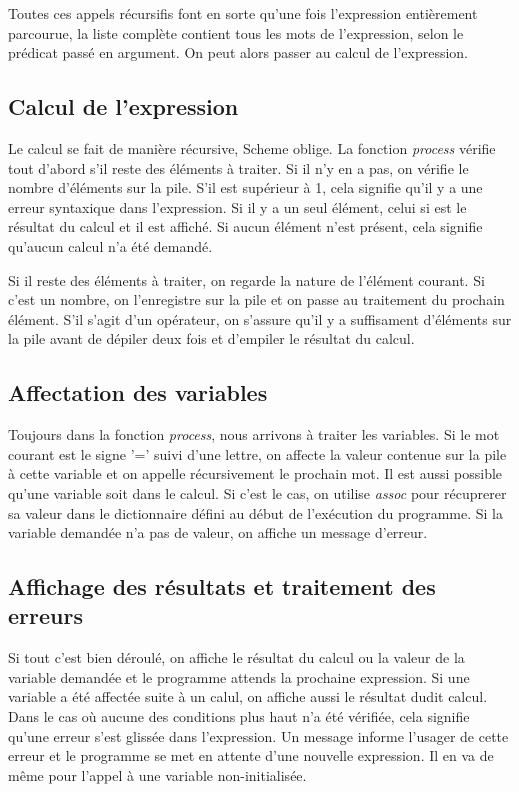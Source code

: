 \documentclass[letterpaper,12pt]{scrartcl}
\begin{document}
        Toutes ces appels récursifis font en sorte qu'une fois l'expression entièrement parcourue, la liste complète contient tous les mots de l'expression, selon le prédicat passé en argument. On peut alors passer au calcul de l'expression.
        \subsection{Calcul de l'expression}
        Le calcul se fait de manière récursive, Scheme oblige. La fonction \textit{process} vérifie tout d'abord s'il reste des éléments à traiter. Si il n'y en a pas, on vérifie le nombre d'éléments sur la pile. S'il est supérieur à 1, cela signifie qu'il y a une erreur syntaxique dans l'expression. Si il y a un seul élément, celui si est le résultat du calcul et il est affiché. Si aucun élément n'est présent, cela signifie qu'aucun calcul n'a été demandé.
        
        Si il reste des éléments à traiter, on regarde la nature de l'élément courant. Si c'est un nombre, on l'enregistre sur la pile et on passe au traitement du prochain élément. S'il s'agit d'un opérateur, on s'assure qu'il y a suffisament d'éléments sur la pile avant de dépiler deux fois et d'empiler le résultat du calcul.
        \subsection{Affectation des variables}
        Toujours dans la fonction \textit{process}, nous arrivons à traiter les variables. Si le mot courant est le signe '=' suivi d'une lettre, on affecte la valeur contenue sur la pile à cette variable et on appelle récursivement le prochain mot. Il est aussi possible qu'une variable soit dans le calcul. Si c'est le cas, on utilise \textit{assoc} pour récuprerer sa valeur dans le dictionnaire défini au début de l'exécution du programme. Si la variable demandée n'a pas de valeur, on affiche un message d'erreur.
        \subsection{Affichage des résultats et traitement des erreurs}
        Si tout c'est bien déroulé, on affiche le résultat du calcul ou la valeur de la variable demandée et le programme attends la prochaine expression. Si une variable a été affectée suite à un calul, on affiche aussi le résultat dudit calcul. Dans le cas où aucune des conditions plus haut n'a été vérifiée, cela signifie qu'une erreur s'est glissée dans l'expression. Un message informe l'usager de cette erreur et le programme se met en attente d'une nouvelle expression. Il en va de même pour l'appel à une variable non-initialisée.
\end{document}
